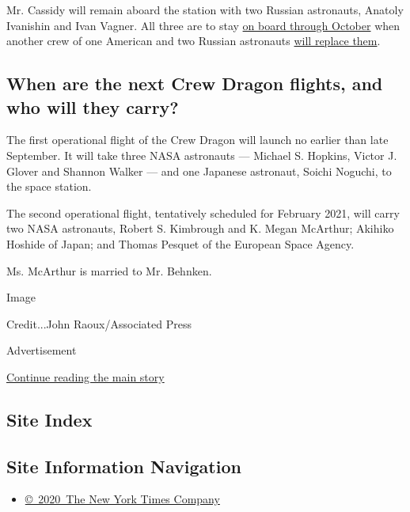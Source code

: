 Mr. Cassidy will remain aboard the station with two Russian astronauts,
Anatoly Ivanishin and Ivan Vagner. All three are to stay
\href{https://www.nasa.gov/sites/default/files/atoms/files/exp-63-summary.pdf}{on
board through October} when another crew of one American and two Russian
astronauts
\href{https://www.nasa.gov/press-release/nasa-astronaut-kate-rubins-crewmates-to-discuss-upcoming-spaceflight}{will
replace them}.

\hypertarget{when-are-the-next-crew-dragon-flights-and-who-will-they-carry}{%
\subsection{When are the next Crew Dragon flights, and who will they
carry?}\label{when-are-the-next-crew-dragon-flights-and-who-will-they-carry}}

The first operational flight of the Crew Dragon will launch no earlier
than late September. It will take three NASA astronauts --- Michael S.
Hopkins, Victor J. Glover and Shannon Walker --- and one Japanese
astronaut, Soichi Noguchi, to the space station.

The second operational flight, tentatively scheduled for February 2021,
will carry two NASA astronauts, Robert S. Kimbrough and K. Megan
McArthur; Akihiko Hoshide of Japan; and Thomas Pesquet of the European
Space Agency.

Ms. McArthur is married to Mr. Behnken.

Image

Credit...John Raoux/Associated Press

Advertisement

\protect\hyperlink{after-bottom}{Continue reading the main story}

\hypertarget{site-index}{%
\subsection{Site Index}\label{site-index}}

\hypertarget{site-information-navigation}{%
\subsection{Site Information
Navigation}\label{site-information-navigation}}

\begin{itemize}
\tightlist
\item
  \href{https://help.nytimes.com/hc/en-us/articles/115014792127-Copyright-notice}{©~2020~The
  New York Times Company}
\end{itemize}

